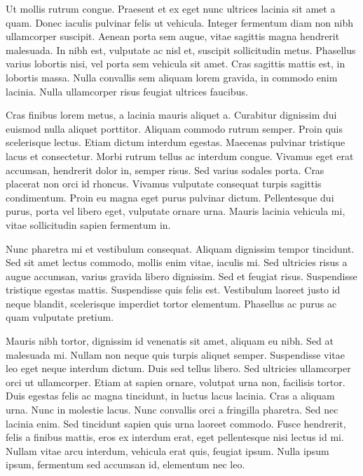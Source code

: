 \documentclass[%
  a4paper,
  10pt,
  version=last
]{scrartcl}
\begin{document}
  Ut mollis rutrum congue. Praesent et ex eget nunc ultrices lacinia sit amet a
  quam. Donec iaculis pulvinar felis ut vehicula. Integer fermentum diam non
  nibh ullamcorper suscipit. Aenean porta sem augue, vitae sagittis magna
  hendrerit malesuada. In nibh est, vulputate ac nisl et, suscipit sollicitudin
  metus.  Phasellus varius lobortis nisi, vel porta sem vehicula sit amet. Cras
  sagittis mattis est, in lobortis massa. Nulla convallis sem aliquam lorem
  gravida, in commodo enim lacinia. Nulla ullamcorper risus feugiat ultrices
  faucibus.

  Cras finibus lorem metus, a lacinia mauris aliquet a. Curabitur dignissim dui
  euismod nulla aliquet porttitor. Aliquam commodo rutrum semper. Proin quis
  scelerisque lectus. Etiam dictum interdum egestas. Maecenas pulvinar
  tristique lacus et consectetur. Morbi rutrum tellus ac interdum congue.
  Vivamus eget erat accumsan, hendrerit dolor in, semper risus. Sed varius
  sodales porta. Cras placerat non orci id rhoncus. Vivamus vulputate consequat
  turpis sagittis condimentum. Proin eu magna eget purus pulvinar dictum.
  Pellentesque dui purus, porta vel libero eget, vulputate ornare urna. Mauris
  lacinia vehicula mi, vitae sollicitudin sapien fermentum in.

  Nunc pharetra mi et vestibulum consequat. Aliquam dignissim tempor tincidunt.
  Sed sit amet lectus commodo, mollis enim vitae, iaculis mi. Sed ultricies
  risus a augue accumsan, varius gravida libero dignissim. Sed et feugiat
  risus.  Suspendisse tristique egestas mattis. Suspendisse quis felis est.
  Vestibulum laoreet justo id neque blandit, scelerisque imperdiet tortor
  elementum.  Phasellus ac purus ac quam vulputate pretium.

  Mauris nibh tortor, dignissim id venenatis sit amet, aliquam eu nibh. Sed at
  malesuada mi. Nullam non neque quis turpis aliquet semper. Suspendisse vitae
  leo eget neque interdum dictum. Duis sed tellus libero. Sed ultricies
  ullamcorper orci ut ullamcorper. Etiam at sapien ornare, volutpat urna non,
  facilisis tortor. Duis egestas felis ac magna tincidunt, in luctus lacus
  lacinia. Cras a aliquam urna. Nunc in molestie lacus. Nunc convallis orci a
  fringilla pharetra. Sed nec lacinia enim. Sed tincidunt sapien quis urna
  laoreet commodo. Fusce hendrerit, felis a finibus mattis, eros ex interdum
  erat, eget pellentesque nisi lectus id mi. Nullam vitae arcu interdum,
  vehicula erat quis, feugiat ipsum. Nulla ipsum ipsum, fermentum sed accumsan
  id, elementum nec leo.
\end{document}
